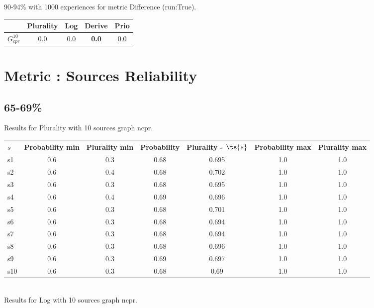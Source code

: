 \documentclass{article}
\newcommand{\graph}[2]{$G_{#1}^{#2}$}
\begin{document}
90-94\% with 1000 experiences for metric Difference (run:True).

\noindent\begin{tabular}{|l|c|c|c|c|}
\hline
& Plurality& Log& Derive& Prio\\
\hline
\graph{cpr}{10} &0.0&0.0&\textbf{0.0}&0.0\\
\hline
\end{tabular}
\newpage
\newpage
\section{Metric : Sources Reliability}

\newpage
\newpage

\subsection{65-69\%}

\noindent Results for Plurality with 10 sources graph ncpr.

\noindent\begin{tabular}{|l|c|c|c|c|c|c|}
\hline
$s$& Probability min & Plurality min & Probability & Plurality - $\ts{s}$ & Probability max & Plurality max\\
\hline
s1 &0.6 & 0.3 & 0.68 & 0.695 & 1.0 & 1.0\\
\hline
s2 &0.6 & 0.4 & 0.68 & 0.702 & 1.0 & 1.0\\
\hline
s3 &0.6 & 0.3 & 0.68 & 0.695 & 1.0 & 1.0\\
\hline
s4 &0.6 & 0.4 & 0.69 & 0.696 & 1.0 & 1.0\\
\hline
s5 &0.6 & 0.3 & 0.68 & 0.701 & 1.0 & 1.0\\
\hline
s6 &0.6 & 0.3 & 0.68 & 0.694 & 1.0 & 1.0\\
\hline
s7 &0.6 & 0.3 & 0.68 & 0.694 & 1.0 & 1.0\\
\hline
s8 &0.6 & 0.3 & 0.68 & 0.696 & 1.0 & 1.0\\
\hline
s9 &0.6 & 0.3 & 0.69 & 0.697 & 1.0 & 1.0\\
\hline
s10 &0.6 & 0.3 & 0.68 & 0.69 & 1.0 & 1.0\\
\hline
\end{tabular}\\

\noindent Results for Log with 10 sources graph ncpr.
\end{document}
